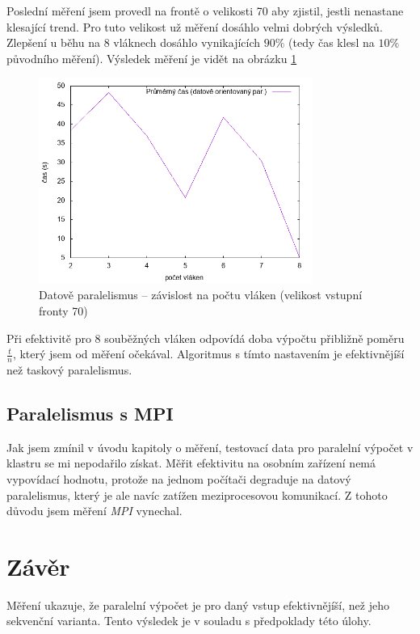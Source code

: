 \documentclass[czech]{article}
\begin{document}
Poslední měření jsem provedl na frontě o velikosti 70 aby zjistil, jestli nenastane klesající trend.
Pro tuto velikost už měření dosáhlo velmi dobrých výsledků.
Zlepšení u běhu na 8 vláknech dosáhlo vynikajících $90\%$ (tedy čas klesl na $10\%$ původního měření).
Výsledek měření je vidět na obrázku \ref{fig:data-2}

\begin{figure}[H]
    \centering
    \includegraphics[width=0.8\textwidth]{assets/parallel-data-oriented-2.png}
    \caption{Datově paralelismus -- závislost na počtu vláken (velikost vstupní fronty 70)}
    \label{fig:data-2}
\end{figure}

Při efektivitě pro 8 souběžných vláken odpovídá doba výpočtu přibližně poměru $\frac{t}{n}$, který jsem od měření očekával.
Algoritmus s tímto nastavením je efektivnějíší než taskový paralelismus.

\subsection{Paralelismus s MPI}

Jak jsem zmínil v úvodu kapitoly o měření, testovací data pro paralelní výpočet v klastru se mi nepodařilo získat.
Měřit efektivitu na osobním zařízení nemá vypovídací hodnotu, protože na jednom počítači degraduje na datový paralelismus, který je ale navíc zatížen meziprocesovou komunikací.
Z tohoto důvodu jsem měření \textit{MPI} vynechal.

\section{Závěr}

Měření ukazuje, že paralelní výpočet je pro daný vstup efektivnějíší, než jeho sekvenční varianta.
Tento výsledek je v souladu s předpoklady této úlohy.
\end{document}
